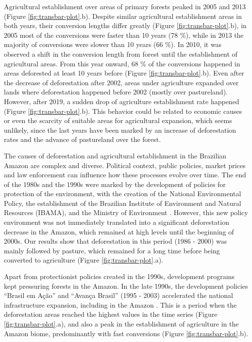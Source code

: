 \documentclass[essd, manuscript]{copernicus}
\begin{document}
Agricultural establishment over areas of primary forests peaked in 2005 and 2013 (Figure \ref{fig:transbar-plot}.b).
Despite similar agricultural establishment areas in both years, their conversion lengths differ greatly (Figure \ref{fig:transbar-plot}.b), in 2005 most of the conversions were faster than 10 years (78 \%), while in 2013 the majority of conversions were slower than 10 years (66 \%).
In 2010, it was observed a shift in the conversion length from forest until the establishment of agricultural areas.
From this year onward, 68 \% of the conversions happened in areas deforested at least 10 years before (Figure \ref{fig:transbar-plot}.b).
Even after the decrease of deforestation after 2002, areas under agriculture expanded over lands where deforestation happened before 2002 (mostly over pastureland).
However, after 2019, a sudden drop of agriculture establishment rate happened (Figure \ref{fig:transbar-plot}.b).
This behavior could be related to economic causes or even the scarcity of suitable areas for agricultural expansion, which seems unlikely, since the last years have been marked by an increase of deforestation rates and the advance of pastureland over the forest.

The causes of deforestation and agricultural establishment in the Brazilian Amazon are complex and diverse.
Political context, public policies, market prices and law enforcement can influence how these processes evolve over time.
The end of the 1980s and the 1990s were marked by the development of policies for protection of the environment, with the creation of the National Environmental Policy, the establishment of the Brazilian Institute of Environment and Natural Resources (IBAMA), and the Ministry of Environment \citep{Banerjee2009}.
However, this new policy environment was not immediately translated into a significant deforestation decrease in the Amazon, which remained at high levels until the beginning of 2000s.
Our results show that deforestation in this period (1986 - 2000) was mainly followed by pasture, which remained for a long time before being converted to agriculture (Figure \ref{fig:transbar-plot}.a).

Apart from protectionist policies created in the 1990s, development programs kept pressuring forests in the Amazon.
In the late 1990s, the development policies ``Brasil em Ação'' and ``Avança Brasil'' (1995 - 2003) accelerated the national infrastructure expansion, including in the Amazon \citep{Carvalho2002}.
This is a period when the deforestation areas reached the highest values in the time series (Figure \ref{fig:transbar-plot}.a), and also a peak in the establishment of agriculture in the Amazon biome, predominantly with fast conversions (Figure \ref{fig:transbar-plot}.b).
\end{document}
